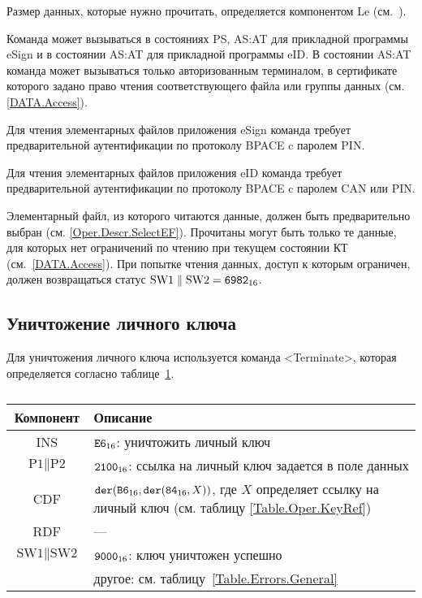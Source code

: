 Размер данных, которые нужно прочитать, определяется компонентом 
Le (см.~\cite{APDU}).

Команда может вызываться в состояниях PS, AS:AT 
для прикладной программы eSign и в состоянии 
AS:AT для прикладной программы eID.
В состоянии AS:AT команда может вызываться только 
авторизованным терминалом, в сертификате которого
задано право чтения соответствующего файла или группы данных
(см. \ref{DATA.Access}).

Для чтения элементарных файлов приложения eSign команда требует 
предварительной аутентификации по протоколу BPACE c 
паролем PIN.

Для чтения элементарных файлов приложения eID команда требует 
предварительной аутентификации по протоколу BPACE c 
паролем CAN или PIN.

Элементарный файл, из которого читаются данные, должен быть предварительно 
выбран (см. \ref{Oper.Descr.SelectEF}). Прочитаны могут быть только те данные, 
для которых нет ограничений по чтению при текущем состоянии КТ (см.~\ref{DATA.Access}). 
При попытке чтения данных, доступ к которым ограничен, должен возвращаться 
статус $\text{SW1} \parallel \text{SW2} = \texttt{6982}_{16}$.

\subsection{Уничтожение личного ключа}
\label{Oper.Descr.Terminate}

Для уничтожения личного ключа используется команда <Terminate>,
которая определяется согласно 
таблице~\ref{Table.Oper.TerminateCmd}.

\begin{table}[ht]
\caption{}\label{Table.Oper.TerminateCmd}
\begin{tabular}{|c|p{14cm}|}
\hline
Компонент & Описание\\
\hline
\hline
INS & $\texttt{E6}_{16}$: уничтожить личный ключ \\
\hline
$\text{P1} \parallel\text{P2}$ & $\texttt{2100}_{16}$:
ссылка на личный ключ задается в поле данных\\
\hline
CDF &  $\texttt{der}(\texttt{B6}_{16},\texttt{der}(\texttt{84}_{16}, X))$,
где $X$ определяет ссылку на личный ключ
(см. таблицу \ref{Table.Oper.KeyRef})\\ 
\hline 
RDF & ---  \\
\hline
$\text{SW1} \parallel \text{SW2}$ & 
$\texttt{9000}_{16}$: ключ уничтожен успешно\\
 & другое: см. таблицу~\ref{Table.Errors.General} \\
\hline
\end{tabular}
\end{table}

